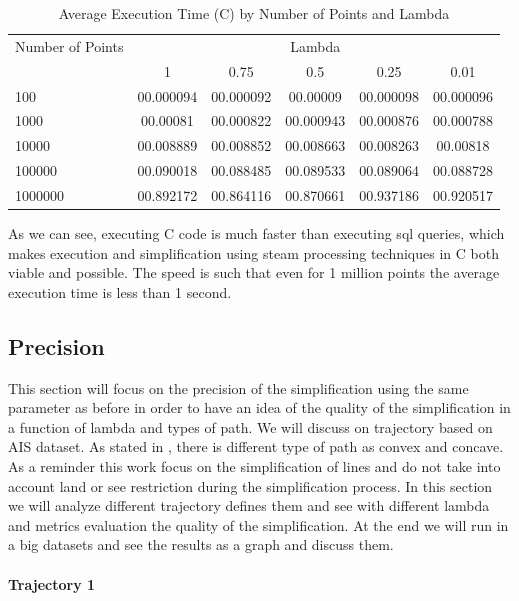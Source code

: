 \begin{table}[htbp]
\centering
\label{tab:execution_time_c}
\begin{tabular}{@{}lccccc@{}}
\toprule
Number of Points & \multicolumn{5}{c}{Lambda} \\
\cmidrule{2-6}
& 1         & 0.75       & 0.5        & 0.25       & 0.01       \\
\midrule
100              & 00.000094 & 00.000092 & 00.00009 & 00.000098 & 00.000096 \\
1000             & 00.00081  & 00.000822 & 00.000943 & 00.000876 & 00.000788 \\
10000            & 00.008889 & 00.008852 & 00.008663 & 00.008263 & 00.00818 \\
100000           & 00.090018  & 00.088485 & 00.089533 & 00.089064 & 00.088728 \\
1000000          & 00.892172 & 00.864116 & 00.870661 & 00.937186 & 00.920517 \\
\bottomrule
\end{tabular}
\caption{Average Execution Time (C) by Number of Points and Lambda}
\end{table}

As we can see, executing C code is much faster than executing sql queries, which makes execution and simplification using steam processing techniques in C both viable and possible. The speed is such that even for 1 million points the average execution time is less than 1 second.

\subsection{Precision}
This section will focus on the precision of the simplification using the same parameter as before in order to have an idea of the quality of the simplification in a function of lambda and types of path. We will discuss on trajectory based on AIS dataset. As stated in \cite{abam2007streaming}, there is different type of path as convex and concave. As a reminder this work focus on the simplification of lines and do not take into account land or see restriction during the simplification process. In this section we will analyze different trajectory defines them and see with different lambda and metrics evaluation the quality of the simplification. At the end we will run in a big datasets and see the results as a graph and discuss them.

\paragraph{Trajectory 1}

